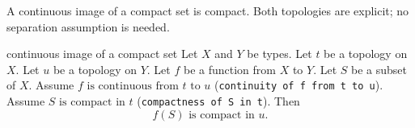 A continuous image of a compact set is compact.
Both topologies are explicit; no separation assumption is needed.
\par

\begin{cleanresult}{continuous image of a compact set}
Let $X$ and $Y$ be types.
Let $t$ be a topology on $X$.
Let $u$ be a topology on $Y$.
Let $f$ be a function from $X$ to $Y$.
Let $S$ be a subset of $X$.
Assume $f\text{ is continuous from }t\text{ to }u$ (\texttt{continuity of f from t to u}).
Assume $S\text{ is compact in }t$ (\texttt{compactness of S in t}).
Then \[f(S)\text{ is compact in }u.\]
\par{}
\end{cleanresult}


